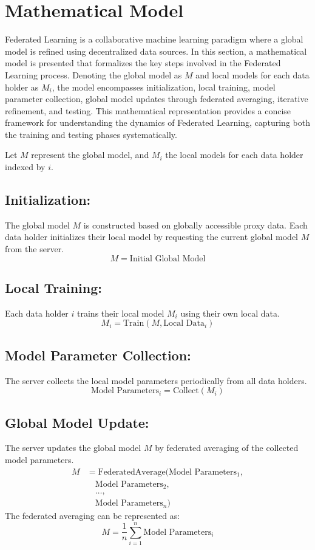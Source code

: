 \documentclass[conference]{IEEEtran}
\begin{document}

\section{Mathematical Model}
Federated Learning is a collaborative machine learning paradigm where a global model is refined using decentralized data sources. In this section, a mathematical model is presented that formalizes the key steps involved in the Federated Learning process. Denoting the global model as \(M\) and local models for each data holder as \(M_i\), the model encompasses initialization, local training, model parameter collection, global model updates through federated averaging, iterative refinement, and testing. This mathematical representation provides a concise framework for understanding the dynamics of Federated Learning, capturing both the training and testing phases systematically.

Let \(M\) represent the global model, and \(M_i\) the local models for each data holder indexed by \(i\).

\subsection{Initialization:}
The global model \(M\) is constructed based on globally accessible proxy data. Each data holder initializes their local model by requesting the current global model \(M\) from the server.
\[ M = \text{Initial Global Model} \]

\subsection{Local Training:}
Each data holder \(i\) trains their local model \(M_i\) using their own local data.
\[ M_i = \text{Train}(M, \text{Local Data}_i) \]

\subsection{Model Parameter Collection:}
The server collects the local model parameters periodically from all data holders.
\[ \text{Model Parameters}_i = \text{Collect}(M_i) \]

\subsection{Global Model Update:}
The server updates the global model \(M\) by federated averaging of the collected model parameters.
\begin{align*}
M &= \text{FederatedAverage}(\text{Model Parameters}_1, \\
&\quad \text{Model Parameters}_2, \\
&\quad \ldots, \\
&\quad \text{Model Parameters}_n)
\end{align*}
The federated averaging can be represented as:
\[ M = \frac{1}{n} \sum_{i=1}^{n} \text{Model Parameters}_i \]
\end{document}
